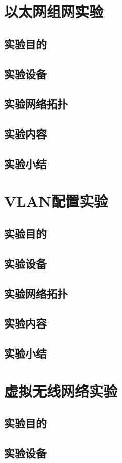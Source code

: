 \documentclass[lang=cn,11pt,a4paper,cite=authoryear]{elegantpaper}
\begin{document}
\section{以太网组网实验}
\subsection{实验目的}
\subsection{实验设备}
\subsection{实验网络拓扑}
\subsection{实验内容}
\subsection{实验小结}
\section{VLAN配置实验}
\subsection{实验目的}
\subsection{实验设备}
\subsection{实验网络拓扑}
\subsection{实验内容}
\subsection{实验小结}
\section{虚拟无线网络实验}
\subsection{实验目的}
\subsection{实验设备}
\end{document}
